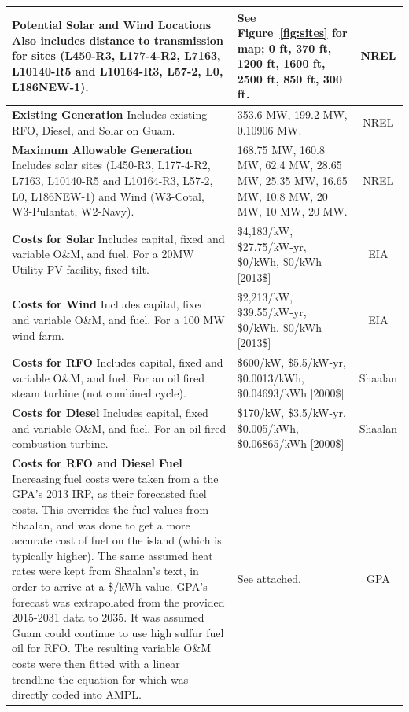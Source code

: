 \documentclass[12pt,letterpaper,fleqn]{article}
\begin{document}
\begin{center}
\begin{longtable}{| p{10cm} | p{4cm} | c | }
    \textbf{Potential Solar and Wind Locations} Also includes distance
    to transmission for sites (L450-R3, L177-4-R2, L7163, L10140-R5
    and L10164-R3, L57-2, L0, L186NEW-1). & See Figure~\ref{fig:sites}
    for map; 0 ft, 370 ft, 1200 ft, 1600 ft, 2500 ft, 850 ft, 300 ft. &
    NREL \cite{misty} \\\hline

    \textbf{Existing Generation} Includes existing RFO, Diesel, and
    Solar on Guam. & 353.6 MW, 199.2 MW, 0.10906 MW. & NREL
    \cite{misty} \\\hline

    \textbf{Maximum Allowable Generation} Includes solar sites
    (L450-R3, L177-4-R2, L7163, L10140-R5 and L10164-R3, L57-2, L0,
    L186NEW-1) and Wind (W3-Cotal, W3-Pulantat, W2-Navy). & 168.75 MW,
    160.8 MW, 62.4 MW, 28.65 MW, 25.35 MW, 16.65 MW, 10.8 MW, 20 MW,
    10 MW, 20 MW. & NREL \cite{misty} \\\hline

    \textbf{Costs for Solar} Includes capital, fixed and variable
    O\&M, and fuel. For a 20MW Utility PV facility, fixed tilt. &
    \$4,183/kW, \$27.75/kW-yr, \$0/kWh, \$0/kWh [2013\$] & EIA
    \cite{eia13} \\\hline

    \textbf{Costs for Wind} Includes capital, fixed and variable O\&M,
    and fuel. For a 100 MW wind farm. & \$2,213/kW, \$39.55/kW-yr,
    \$0/kWh, \$0/kWh [2013\$] & EIA \cite{eia13} \\\hline

    \textbf{Costs for RFO} Includes capital, fixed and variable O\&M,
    and fuel. For an oil fired steam turbine (not combined cycle). &
    \$600/kW, \$5.5/kW-yr, \$0.0013/kWh, \$0.04693/kWh [2000\$] &
    Shaalan \cite{shaalan01} \\\hline

    \textbf{Costs for Diesel} Includes capital, fixed and variable
    O\&M, and fuel. For an oil fired combustion turbine. & \$170/kW,
    \$3.5/kW-yr, \$0.005/kWh, \$0.06865/kWh [2000\$] & Shaalan
    \cite{shaalan01} \\\hline

    \textbf{Costs for RFO and Diesel Fuel} Increasing fuel costs were
    taken from a the GPA's 2013 IRP, as their forecasted fuel
    costs. This overrides the fuel values from Shaalan, and was done
    to get a more accurate cost of fuel on the island (which is
    typically higher). The same assumed heat rates were kept from
    Shaalan's text, in order to arrive at a \$/kWh value. GPA's
    forecast was extrapolated from the provided 2015-2031 data to
    2035. It was assumed Guam could continue to use high sulfur fuel
    oil for RFO. The resulting variable O\&M costs were then fitted
    with a linear trendline the equation for which was directly coded
    into AMPL. & See attached. & GPA \cite{cruz13} \\\hline


\end{longtable}
\end{center}
\end{document}
